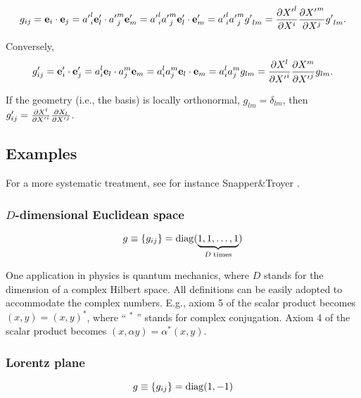 \begin{equation}
g_{ij}={\bf e}_i\cdot {\bf e}_j
={a'}^l_i{\bf e}'_l\cdot {a'}^m_j{\bf e}'_m
={a'}^l_i {a'}^m_j {\bf e}'_l\cdot {\bf e}'_m
= {a'}^l_i {a'}^m_j {g'}_{lm}
= {\partial {X'}^l\over \partial X^i}{\partial {X'}^m\over \partial X^j} {g'}_{lm}
.
\end{equation}

Conversely,
\begin{equation}
g'_{ij}={\bf e}'_i\cdot {\bf e}'_j
={a}^l_i{\bf e}_l\cdot {a}^m_j{\bf e}_m
={a}^l_i {a}^m_j {\bf e}_l\cdot {\bf e}_m
= {a}^l_i {a}^m_j {g}_{lm}
= {\partial {X}^l\over \partial {X'}^i}{\partial {X}^m\over \partial {X'}^j} {g}_{lm}
.
\end{equation}


If the geometry (i.e., the basis) is locally orthonormal, ${g}_{lm}=\delta_{lm}$,
then
$g'_{ij}={\partial {X}^l\over \partial {X'}^i}{\partial {X}_l\over \partial {X'}^j}$.



\subsection{Examples}

For a more systematic treatment, see for instance Snapper\&Troyer \cite{snapper-troyer}.


\subsubsection{$D$-dimensional Euclidean space}

\begin{equation}
g\equiv \{g_{ij}\}={\rm diag} (\underbrace{1,1,\ldots ,1}_{D\; {\rm times}})
\end{equation}

One application in physics is quantum mechanics,
where $D$ stands for the dimension of a complex Hilbert space.
All definitions can be easily adopted to accommodate the complex numbers.
E.g., axiom 5 of the scalar product becomes
$(x,y)=(x,y)^\ast$, where `` $^\ast$ '' stands for complex conjugation.
Axiom 4 of the scalar product becomes
$(x,\alpha y)=\alpha^\ast (x,y)$.

\subsubsection{Lorentz plane}


\begin{equation}
g\equiv \{g_{ij}\}={\rm diag} (1,-1)
\end{equation}

